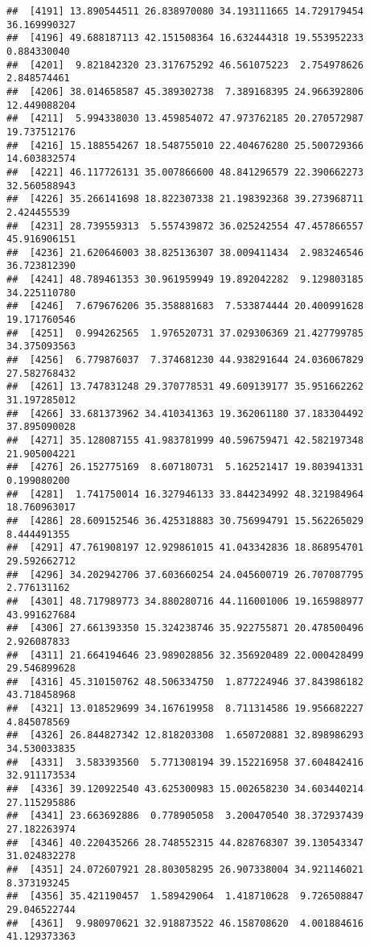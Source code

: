 \documentclass[
]{article}
\begin{document}
\begin{verbatim}
##  [4191] 13.890544511 26.838970080 34.193111665 14.729179454 36.169990327
##  [4196] 49.688187113 42.151508364 16.632444318 19.553952233  0.884330040
##  [4201]  9.821842320 23.317675292 46.561075223  2.754978626  2.848574461
##  [4206] 38.014658587 45.389302738  7.389168395 24.966392806 12.449088204
##  [4211]  5.994338030 13.459854072 47.973762185 20.270572987 19.737512176
##  [4216] 15.188554267 18.548755010 22.404676280 25.500729366 14.603832574
##  [4221] 46.117726131 35.007866600 48.841296579 22.390662273 32.560588943
##  [4226] 35.266141698 18.822307338 21.198392368 39.273968711  2.424455539
##  [4231] 28.739559313  5.557439872 36.025242554 47.457866557 45.916906151
##  [4236] 21.620646003 38.825136307 38.009411434  2.983246546 36.723812390
##  [4241] 48.789461353 30.961959949 19.892042282  9.129803185 34.225110780
##  [4246]  7.679676206 35.358881683  7.533874444 20.400991628 19.171760546
##  [4251]  0.994262565  1.976520731 37.029306369 21.427799785 34.375093563
##  [4256]  6.779876037  7.374681230 44.938291644 24.036067829 27.582768432
##  [4261] 13.747831248 29.370778531 49.609139177 35.951662262 31.197285012
##  [4266] 33.681373962 34.410341363 19.362061180 37.183304492 37.895090028
##  [4271] 35.128087155 41.983781999 40.596759471 42.582197348 21.905004221
##  [4276] 26.152775169  8.607180731  5.162521417 19.803941331  0.199080200
##  [4281]  1.741750014 16.327946133 33.844234992 48.321984964 18.760963017
##  [4286] 28.609152546 36.425318883 30.756994791 15.562265029  8.444491355
##  [4291] 47.761908197 12.929861015 41.043342836 18.868954701 29.592662712
##  [4296] 34.202942706 37.603660254 24.045600719 26.707087795  2.776131162
##  [4301] 48.717989773 34.880280716 44.116001006 19.165988977 43.991627684
##  [4306] 27.661393350 15.324238746 35.922755871 20.478500496  2.926087833
##  [4311] 21.664194646 23.989028856 32.356920489 22.000428499 29.546899628
##  [4316] 45.310150762 48.506334750  1.877224946 37.843986182 43.718458968
##  [4321] 13.018529699 34.167619958  8.711314586 19.956682227  4.845078569
##  [4326] 26.844827342 12.818203308  1.650720881 32.898986293 34.530033835
##  [4331]  3.583393560  5.771308194 39.152216958 37.604842416 32.911173534
##  [4336] 39.120922540 43.625300983 15.002658230 34.603440214 27.115295886
##  [4341] 23.663692886  0.778905058  3.200470540 38.372937439 27.182263974
##  [4346] 40.220435266 28.748552315 44.828768307 39.130543347 31.024832278
##  [4351] 24.072607921 28.803058295 26.907338004 34.921146021  8.373193245
##  [4356] 35.421190457  1.589429064  1.418710628  9.726508847 29.046522744
##  [4361]  9.980970621 32.918873522 46.158708620  4.001884616 41.129373363

\end{verbatim}
\end{document}
